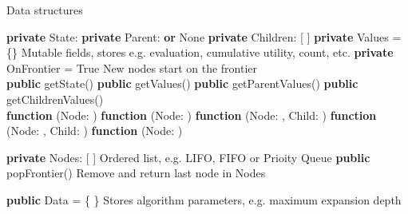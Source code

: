 \begin{algorithm}[H]
    \caption{Data structures}
    \label{alg:general_tree_search_data}
    \begin{algorithmic}[1]
            \State \textbf{private} State: 
            \State \textbf{private} Parent:  \textbf{or} None
            \State \textbf{private} Children: [ ]
            \State \textbf{private} Values = \{\}
            \Comment Mutable fields, stores e.g. evaluation, cumulative utility, count, etc.
            \State \textbf{private} OnFrontier = True            
            \Comment New nodes start on the frontier
            \\
            \State \textbf{public} getState()
            \State \textbf{public} getValues()
            \State \textbf{public} getParentValues()
            \State \textbf{public} getChildrenValues()
        \EndObj
        \\
        \State \textbf{function} (Node: )
        \State \textbf{function} (Node: )
        \State \textbf{function} (Node: , Child: )
        \State \textbf{function} (Node: , Child: )
        \State \textbf{function} (Node: )
    \end{algorithmic}
    \vspace{.25cm}
    \begin{algorithmic}[1]
            \State \textbf{private} Nodes: [ ]
            \Comment Ordered list, e.g. LIFO, FIFO or Prioity Queue
            \State \textbf{public} popFrontier()
            \Comment Remove and return last node in Nodes
            \EndObj
    \end{algorithmic}
    \vspace{.25cm}
    \begin{algorithmic}[1]
            \State \textbf{public} Data = \{ \}
            \Comment Stores algorithm parameters, e.g. maximum expansion depth
        \EndObj
    \end{algorithmic}
\end{algorithm}